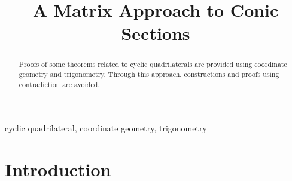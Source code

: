 \documentclass[]{interact}
\theoremstyle{plain}%
\theoremstyle{definition}
\theoremstyle{remark}
\begin{document}

\title{A Matrix Approach to Conic Sections}

\author{
}

\maketitle

\begin{abstract}
  Proofs of some theorems related to cyclic quadrilaterals are provided using coordinate geometry and trigonometry.  Through this approach, constructions and proofs using contradiction are avoided. 
\end{abstract}

\begin{keywords}
  cyclic quadrilateral, coordinate geometry, trigonometry
\end{keywords}


\section{Introduction}

  
\end{document}
